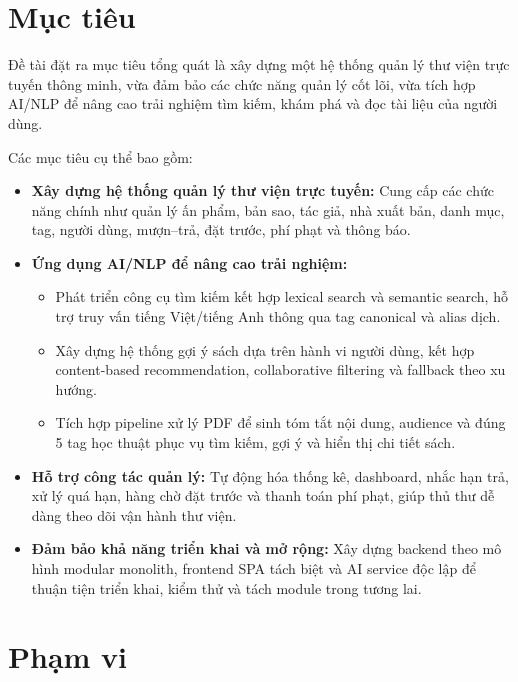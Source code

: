 \section{Mục tiêu}
\label{sec:MucTieu}

Đề tài đặt ra mục tiêu tổng quát là xây dựng một hệ thống quản lý thư viện trực
tuyến thông minh, vừa đảm bảo các chức năng quản lý cốt lõi, vừa tích hợp AI/NLP
để nâng cao trải nghiệm tìm kiếm, khám phá và đọc tài liệu của người dùng.

Các mục tiêu cụ thể bao gồm:
\begin{itemize}
    \item \textbf{Xây dựng hệ thống quản lý thư viện trực tuyến:} Cung cấp các
    chức năng chính như quản lý ấn phẩm, bản sao, tác giả, nhà xuất bản, danh
    mục, tag, người dùng, mượn--trả, đặt trước, phí phạt và thông báo.
    \item \textbf{Ứng dụng AI/NLP để nâng cao trải nghiệm:}
    \begin{itemize}
        \item Phát triển công cụ tìm kiếm kết hợp lexical search và semantic
        search, hỗ trợ truy vấn tiếng Việt/tiếng Anh thông qua tag canonical và
        alias dịch.
        \item Xây dựng hệ thống gợi ý sách dựa trên hành vi người dùng, kết hợp
        content-based recommendation, collaborative filtering và fallback theo
        xu hướng.
        \item Tích hợp pipeline xử lý PDF để sinh tóm tắt nội dung, audience và
        đúng 5 tag học thuật phục vụ tìm kiếm, gợi ý và hiển thị chi tiết sách.
    \end{itemize}
    \item \textbf{Hỗ trợ công tác quản lý:} Tự động hóa thống kê, dashboard,
    nhắc hạn trả, xử lý quá hạn, hàng chờ đặt trước và thanh toán phí phạt, giúp
    thủ thư dễ dàng theo dõi vận hành thư viện.
    \item \textbf{Đảm bảo khả năng triển khai và mở rộng:} Xây dựng backend theo
    mô hình modular monolith, frontend SPA tách biệt và AI service độc lập để
    thuận tiện triển khai, kiểm thử và tách module trong tương lai.
\end{itemize}

\section{Phạm vi}
\label{sec:PhamVi}

